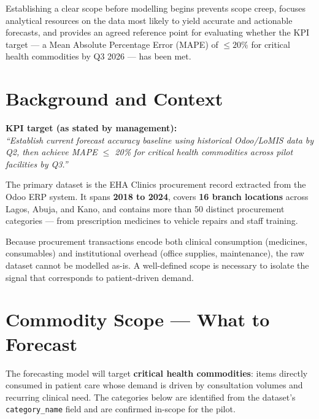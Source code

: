 \documentclass[12pt, a4paper]{article}
\begin{document}
Establishing a clear scope before modelling begins prevents scope creep,
focuses analytical resources on the data most likely to yield accurate and
actionable forecasts, and provides an agreed reference point for evaluating
whether the KPI target --- a Mean Absolute Percentage Error (MAPE) of
$\leq 20\%$ for critical health commodities by Q3 2026 --- has been met.

\section{Background and Context}

\begin{mdframed}[style=keybox]
\textbf{KPI target (as stated by management):}\\
\textit{``Establish current forecast accuracy baseline using historical
Odoo/LoMIS data by Q2, then achieve MAPE $\leq$ 20\% for critical health
commodities across pilot facilities by Q3.''}
\end{mdframed}

\vspace{0.8em}

The primary dataset is the EHA Clinics procurement record extracted from the
Odoo ERP system. It spans \textbf{2018 to 2024}, covers \textbf{16 branch
locations} across Lagos, Abuja, and Kano, and contains more than 50 distinct
procurement categories --- from prescription medicines to vehicle repairs and
staff training.

Because procurement transactions encode both clinical consumption (medicines,
consumables) and institutional overhead (office supplies, maintenance), the
raw dataset cannot be modelled as-is. A well-defined scope is necessary to
isolate the signal that corresponds to patient-driven demand.

\section{Commodity Scope --- What to Forecast}

The forecasting model will target \textbf{critical health commodities}: items
directly consumed in patient care whose demand is driven by consultation
volumes and recurring clinical need. The categories below are identified from
the dataset's \texttt{category\_name} field and are confirmed in-scope for
the pilot.
\end{document}
